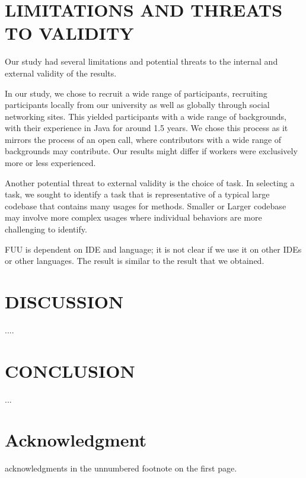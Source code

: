 \documentclass[conference]{IEEEtran}
\begin{document}
\section{LIMITATIONS AND THREATS TO VALIDITY}
Our study had several limitations and potential threats to the internal and external validity of the results. \par  

In our study, we chose to recruit a wide range of participants, recruiting participants locally from our university as well as globally through social networking sites. This yielded participants with a wide range of backgrounds, with their experience in Java for around 1.5 years. We chose this process as it mirrors the process of an open call, where contributors with a wide range of backgrounds may contribute. Our results might differ if workers were exclusively more or less experienced. \par

Another potential threat to external validity is the choice of task. In selecting a task, we sought to identify a task that is representative of a typical large codebase that contains many usages for methods. Smaller or Larger codebase may involve more complex usages where individual behaviors are more challenging to identify. \par 

FUU is dependent on IDE and language; it is not clear if we use it on other IDEs or other languages. The result is similar to the result that we obtained.

\par


\section{DISCUSSION}
....

\section{CONCLUSION}
...


\section*{Acknowledgment}

acknowledgments in the unnumbered footnote on the first page.



\end{document}
